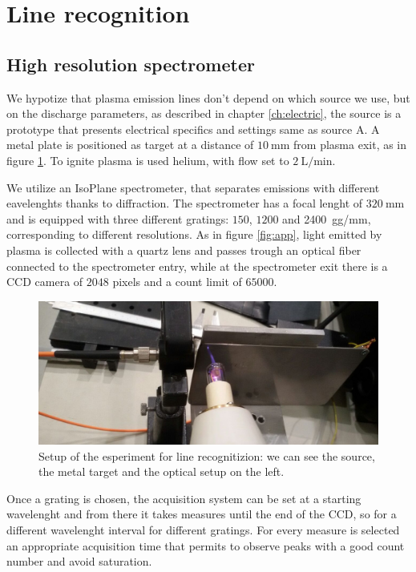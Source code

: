 \section{Line recognition}

\subsection{High resolution spectrometer}
We hypotize that plasma emission lines don't depend on which source we use, but on the discharge parameters, as described in chapter \ref{ch:electric}, the source is a prototype that presents electrical specifics and settings same as source A. A metal plate is positioned as target at a distance of $\SI{10}{\milli\meter}$ from plasma exit, as in figure \ref{fig:app1}. To ignite plasma is used helium, with flow set to $\SI{2}{\liter/\minute}$.

We utilize an IsoPlane spectrometer, that separates emissions with different eavelenghts thanks to diffraction. The spectrometer has a focal lenght of $\SI{320}{\milli\meter}$ and is equipped with three different gratings: $\num{150}$, $\num{1200}$ and \SI{2400}{gg/\milli\meter}, corresponding to different resolutions. %
As in figure \ref{fig:app}, light emitted by plasma is collected with a quartz lens %
and passes trough an optical fiber %
connected to the spectrometer entry, while at the spectrometer exit there is a CCD camera of $2048$ pixels and a count limit of $\num{65000}$.
\begin{figure}
\centering
\includegraphics[width=.6\textwidth]{Images/Spectroscopy/apparato.jpg}
\caption{Setup of the esperiment for line recognitizion: we can see the source, the metal target and the optical setup on the left.}
\label{fig:app1}
\end{figure}

Once a grating is chosen, the acquisition system can be set at a starting wavelenght and from there it takes measures until the end of the CCD, so for a different wavelenght interval for different gratings.
For every measure is selected an appropriate acquisition time that permits to observe peaks with a good count number and avoid saturation.

